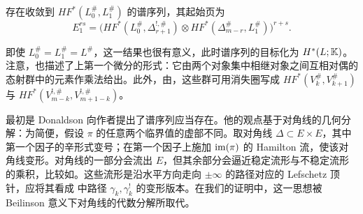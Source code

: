 \begin{corollary}\label{st:18.27}
存在收敛到 $HF^*(L_0^\#,L_1^\#)$ 的谱序列，其起始页为
\begin{equation}\label{eq:18.32}
E_1^{rs}=\bigl(HF^*(L_0^\#,\Delta_{r+1}^{!,\#})\otimes HF^*(\Delta_{m-r}^\#,L_1^\#)\bigr)^{r+s}.
\end{equation}
\end{corollary}

即使 $L_0^\#=L_1^\#=L^\#$，这一结果也很有意义，此时谱序列的目标化为 $H^*(L;\mathbb K)$。注意，也描述了上第一个微分的形式：它由两个对象集中相继对象之间互相对偶的态射群中的元素作乘法给出。此外，由，这些群可用消失圈写成 $HF^*(V_k^\#,V_{k+1}^\#)$ 与 $HF^*(V_{m-k}^{!,\#},V_{m+1-k}^{!,\#})$。

\begin{note}\label{st:18.28}
最初是 Donaldson 向作者提出了谱序列应当存在。他的观点基于对角线的几何分解：为简便，假设 $\pi$ 的任意两个临界值的虚部不同。取对角线 $\Delta\subset E\times E$，其中第一个因子的辛形式变号；在第一个因子上施加 $\operatorname{im}(\pi)$ 的 Hamilton 流，使该对角线变形。对角线的一部分会流出 $E$，但其余部分会逼近稳定流形与不稳定流形的乘积，比较如。这些流形是沿水平方向走向 $\pm\infty$ 的路径对应的 Lefschetz 顶针，应将其看成 中路径 $\gamma_k,\gamma_k^!$ 的变形版本。在我们的证明中，这一思想被 Beilinson 意义下对角线的代数分解所取代。
\end{note}
